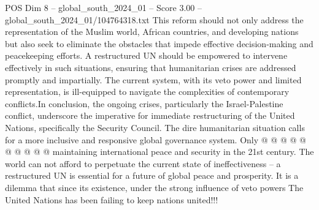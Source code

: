 \begin{textsample}{POS Dim 8 – global\_south\_2024\_01 – Score 3.00 – global\_south\_2024\_01/104764318.txt}
This reform should not only address the representation of the Muslim world, African countries, and developing nations but also seek to eliminate the obstacles that impede effective decision-making and peacekeeping efforts.
A restructured UN should be empowered to intervene effectively in such situations, ensuring that humanitarian crises are addressed promptly and impartially.
The current system, with its veto power and limited representation, is ill-equipped to navigate the complexities of contemporary conflicts.In conclusion, the ongoing crises, particularly the Israel-Palestine conflict, underscore the imperative for immediate restructuring of the United Nations, specifically the Security Council.
The dire humanitarian situation calls for a more inclusive and responsive global governance system.
Only @ @ @ @ @ @ @ @ @ @ maintaining international peace and security in the 21st century.
The world can not afford to perpetuate the current state of ineffectiveness -- a restructured UN is essential for a future of global peace and prosperity.
It is a dilemma that since its existence, under the strong influence of veto powers The United Nations has been failing to keep nations united!!!

\end{textsample}
